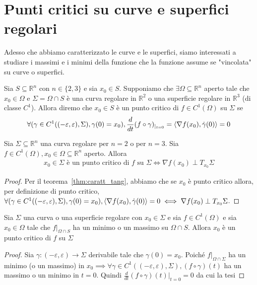 \section{Punti critici su curve e superfici regolari}
Adesso che abbiamo caratterizzato le curve e le superfici, siamo interessati a studiare i massimi e i minimi della funzione che la funzione assume se "vincolata" su curve o superfici. \\
\begin{definition}
Sia $S \subseteq \mathbb{R}^n$ con $n \in \{ 2, 3 \}$ e sia $x_0 \in S$. Supponiamo che $\exists \Omega \subseteq \mathbb{R}^n$ aperto tale che $x_0 \in \Omega$ e $\Sigma = \Omega \cap S$ è una curva regolare in $\mathbb{R}^2$ o una superficie regolare in $\mathbb{R}^3$ (di classe $C^1$). Allora diremo che $x_0 \in S$ è un punto critico di $f \in C^1(\Omega)$ su $\Sigma$ se
$$
\forall (\gamma \in C^1 ((-\varepsilon, \varepsilon), \Sigma), \gamma(0) = x_0), \frac{d}{dt} (f \circ \gamma)_{|_{t=0}} = \langle \nabla f(x_0), \dot{\gamma}(0) \rangle = 0
$$
\end{definition}
\begin{theorem}
Sia $\Sigma \subseteq \mathbb{R}^n$ una curva regolare per $n=2$ o per $n=3$. Sia $f \in C^1(\Omega), x_0 \in \Omega \subseteq \mathbb{R}^n$ aperto. Allora 
\begin{align*}
x_0 \in \Sigma \text{ è un punto critico di } f \text{ su } \Sigma  \iff \nabla f(x_0) \perp T_{x_0} \Sigma
\end{align*}
\label{thm:punti_crit_su_curve}
\end{theorem}
\begin{proof}
Per il teorema~\ref{thm:caratt_tang}, abbiamo che se $x_0$ è punto critico allora, per definizione di punto critico, $\forall (\gamma \in C^1((-\varepsilon, \varepsilon), \Sigma), \gamma(0)=x_0), \langle \nabla f(x_0), \dot{\gamma}(0) \rangle = 0 \iff \nabla f(x_0) \perp T_{x_0} \Sigma$.
\end{proof}
\begin{theorem}
Sia $\Sigma$ una curva o una superficie regolare con $x_0 \in \Sigma$ e sia $f \in C^{1}(\Omega)$ e sia $x_0 \in \Omega$ tale che $f|_{\Omega \cap S}$ ha un minimo o un massimo su $\Omega \cap S$. Allora $x_0$ è un punto critico di $f$ su $\Sigma$
\end{theorem}
\begin{proof}
Sia $\gamma: (-\varepsilon, \varepsilon) \to \Sigma$ derivabile tale che $\gamma(0) = x_0$. Poiché $f|_{\Omega \cap \Sigma}$ ha un minimo (o un massimo) in $x_0 \implies \forall \gamma \in C^{1}((-\varepsilon, \varepsilon), \Sigma), (f \circ \gamma)(t)$ ha un massimo o un minimo in $t = 0$. Quindi $\frac{d}{dt}(f \circ \gamma)(t)|_{t=0} = 0$ da cui la tesi
\end{proof}

